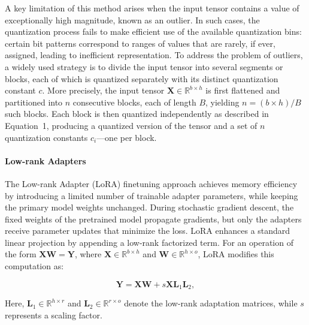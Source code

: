 A key limitation of this method arises when the input tensor contains a value of exceptionally high magnitude, known as an outlier. In such cases, the quantization process fails to make efficient use of the available quantization bins: certain bit patterns correspond to ranges of values that are rarely, if ever, assigned, leading to inefficient representation. To address the problem of outliers, a widely used strategy is to divide the input tensor into several segments or blocks, each of which is quantized separately with its distinct quantization constant $c$. More precisely, the input tensor $\mathbf{X}\in \mathbb{R}^{b\times h}$ is first flattened and partitioned into $n$ consecutive blocks, each of length $B$, yielding ${n = ({b\times h} )/{B} }$ such blocks. Each block is then quantized independently as described in Equation~1, producing a quantized version of the tensor and a set of $n$ quantization constants $c_i$—one per block.

\paragraph{Low-rank Adapters} The Low-rank Adapter (LoRA) finetuning approach \citep{hu2021lora} achieves memory efficiency by introducing a limited number of trainable adapter parameters, while keeping the primary model weights unchanged. During stochastic gradient descent, the fixed weights of the pretrained model propagate gradients, but only the adapters receive parameter updates that minimize the loss. LoRA enhances a standard linear projection by appending a low-rank factorized term. For an operation of the form ${\mathbf{X} \mathbf{W} = \mathbf{Y}}$, where $\mathbf{X}\in  \mathbb{R}^{b\times h}$ and $\mathbf{W}\in  \mathbb{R}^{h\times o}$, LoRA modifies this computation as:

\begin{equation}
    \mathbf{Y} = \mathbf{X}\mathbf{W} + s\mathbf{X}\mathbf{L}_1\mathbf{L}_2,
\end{equation}

Here, $\mathbf{L}_1\in  \mathbb{R}^{h\times r}$ and $\mathbf{L}_2\in  \mathbb{R}^{r\times o}$ denote the low-rank adaptation matrices, while $s$ represents a scaling factor.

